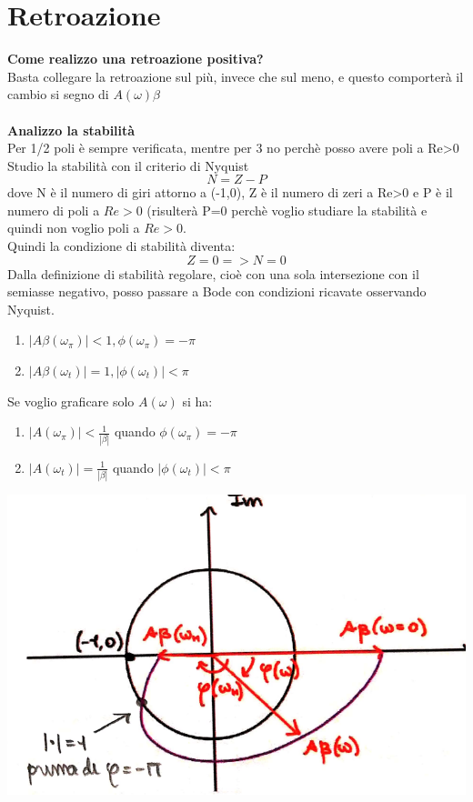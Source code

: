 \documentclass{article}
\begin{document}
\newpage
\section{Retroazione}

\textbf{Come realizzo una retroazione positiva?} \\
Basta collegare la retroazione sul più, invece che sul meno, e questo comporterà il cambio si segno di $
    A(\omega)\beta $ \\ \\
\textbf{Analizzo la stabilità} \\
Per 1/2 poli è sempre verificata, mentre per 3 no perchè posso avere poli a Re>0 \\
Studio la stabilità con il criterio di Nyquist \\
\begin{equation}
    N=Z-P
\end{equation}
dove N è il numero di giri attorno a (-1,0), Z è il numero di zeri a Re>0 e P è il numero di poli a $
    Re>0
$ (risulterà P=0 perchè voglio studiare la stabilità e quindi non voglio poli a $
    Re>0
$.\\
Quindi la condizione di stabilità diventa:
\begin{equation}
    Z=0 => N=0
\end{equation}
Dalla definizione di stabilità regolare, cioè con una sola intersezione con il semiasse negativo, posso passare a Bode con condizioni ricavate osservando Nyquist.
\begin{enumerate}
    \item $ |A\beta(\omega_{\pi})|<1 ,   \phi(\omega_{\pi})=-\pi $
    \item $|A\beta(\omega_{t})|=1 ,   |\phi(\omega_{t})|<\pi$
\end{enumerate}
Se voglio graficare solo $A(\omega)$ si ha:
\begin{enumerate}
    \item $ |A(\omega_{\pi})|<\frac{1}{|\beta|} $ quando $ \phi(\omega_{\pi})=-\pi$
    \item $|A(\omega_{t})|=\frac{1}{|\beta|} $  quando $ |\phi(\omega_{t})|<\pi$
\end{enumerate}
\vspace{4mm}
\begin{center}
    \includegraphics[scale=0.6]{Nyquist.png}
\end{center} 
\vspace{4mm}
\end{document}
